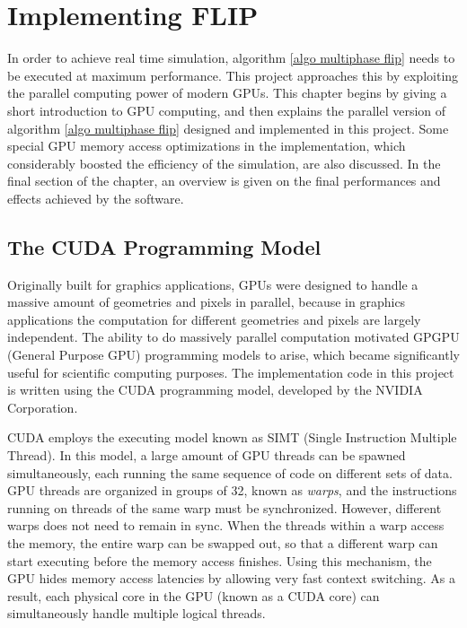 


\chapter{Implementing FLIP}

In order to achieve real time simulation, algorithm \ref{algo multiphase flip} needs to be executed at maximum performance. This project approaches this by exploiting the parallel computing power of modern GPUs. This chapter begins by giving a short introduction to GPU computing, and then explains the parallel version of algorithm \ref{algo multiphase flip} designed and implemented in this project. Some special GPU memory access optimizations in the implementation, which considerably boosted the efficiency of the simulation, are also discussed. In the final section of the chapter, an overview is given on the final performances and effects achieved by the software.


\section{The CUDA Programming Model}

Originally built for graphics applications, GPUs were designed to handle a massive amount of geometries and pixels in parallel, because in graphics applications the computation for different geometries and pixels are largely independent. The ability to do massively parallel computation motivated GPGPU (General Purpose GPU) programming models to arise, which became significantly useful for scientific computing purposes. The implementation code in this project is written using the CUDA programming model, developed by the NVIDIA Corporation.

CUDA employs the executing model known as SIMT (Single Instruction Multiple Thread). In this model, a large amount of GPU threads can be spawned simultaneously, each running the same sequence of code on different sets of data. GPU threads are organized in groups of 32, known as \textit{warps}, and the instructions running on threads of the same warp must be synchronized. However, different warps does not need to remain in sync. When the threads within a warp access the memory, the entire warp can be swapped out, so that a different warp can start executing before the memory access finishes. Using this mechanism, the GPU hides memory access latencies by allowing very fast context switching. As a result, each physical core in the GPU (known as a CUDA core) can simultaneously handle multiple logical threads.

